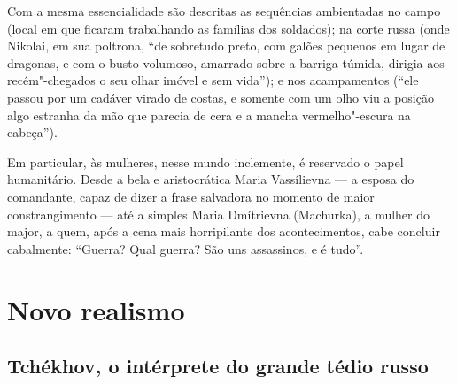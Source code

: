 {{Com a mesma essencialidade são descritas as sequências ambientadas no
campo (local em que ficaram trabalhando as famílias dos soldados); na
corte russa (onde Nikolai, em sua poltrona, ``de sobretudo preto, com
galões pequenos em lugar de dragonas, e com o busto volumoso, amarrado
sobre a barriga túmida, dirigia aos recém"-chegados o seu olhar imóvel e
sem vida''); e nos acampamentos (``ele passou por um cadáver virado de
costas, e somente com um olho viu a posição algo estranha da mão que
parecia de cera e a mancha vermelho"-escura na cabeça'').

Em particular, às mulheres, nesse mundo inclemente, é reservado o papel
humanitário. Desde a bela e aristocrática Maria Vassílievna --- a esposa
do comandante, capaz de dizer a frase salvadora no momento de maior
constrangimento --- até a simples Maria Dmítrievna (Machurka), a mulher
do major, a quem, após a cena mais horripilante dos acontecimentos, cabe
concluir cabalmente: ``Guerra? Qual guerra? São uns assassinos, e é
tudo''.

\part{Novo realismo}

\chapter{Tchékhov, o intérprete do grande tédio russo}

}}
